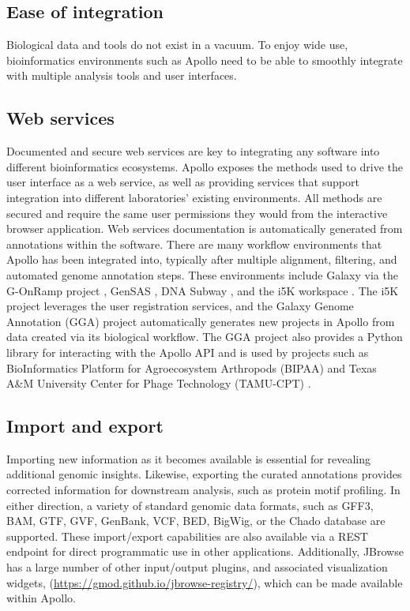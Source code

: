 \subsection*{Ease of integration}

Biological data and tools do not exist in a vacuum. To enjoy wide use,
bioinformatics environments such as Apollo need to be able to smoothly
integrate with multiple analysis tools and user interfaces.

\subsection*{Web services}

Documented and secure web services are key to integrating any software
into different bioinformatics ecosystems. Apollo exposes the methods
used to drive the user interface as a web service, as well as providing
services that support integration into different laboratories' existing
environments. All methods are secured and require the same user
permissions they would from the interactive browser application. Web
services documentation is automatically generated from annotations
within the software. There are many workflow environments that Apollo
has been integrated into, typically after multiple alignment, filtering,
and automated genome annotation steps. These environments include Galaxy
\cite{Afgan_2018} via the G-OnRamp project \cite{GOnRamp}, GenSAS \cite{Lee_2011,Humann2018}, DNA
Subway \cite{Hilgert_2014}, and the i5K workspace \cite{Poelchau_2014}. The i5K project
leverages the user registration services, and the Galaxy Genome
Annotation (GGA) project \cite{Bretaudeau2018} automatically generates new projects
in Apollo from data created via its biological workflow. The GGA project
also provides a Python library for interacting with the Apollo API
\cite{Rasche2017} and is used by projects such as BioInformatics Platform for
Agroecosystem Arthropods (BIPAA) \cite{Bretaudeau2017} and Texas A\&M University
Center for Phage Technology (TAMU-CPT) \cite{Rasche2018}.

\subsection*{Import and export}

Importing new information as it becomes available is essential for
revealing additional genomic insights. Likewise, exporting the curated
annotations provides corrected information for downstream analysis, such
as protein motif profiling. In either direction, a variety of standard
genomic data formats, such as GFF3, BAM, GTF, GVF, GenBank, VCF, BED,
BigWig, or the Chado database \cite{Mungall_2007} are supported. These
import/export capabilities are also available via a REST endpoint for
direct programmatic use in other applications. Additionally, JBrowse has
a large number of other input/output plugins, and associated
visualization widgets, (\url{https://gmod.github.io/jbrowse-registry/}),
which can be made available within Apollo.

